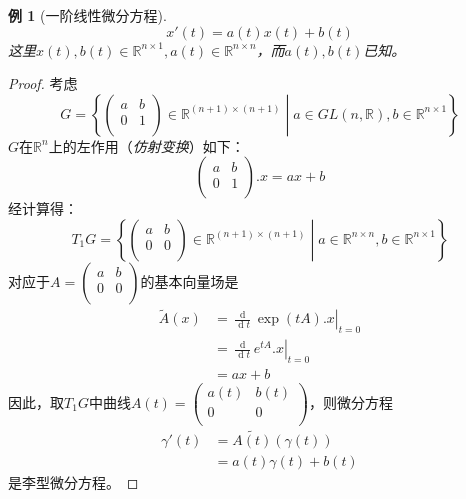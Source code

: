 \documentclass[winfonts,UTF8,c5size,a4paper,fancyhdr,hyperref,titlepage,nocap]{ctexart}
\newtheorem{exa}[thm]{例}
\theoremstyle{definition}
\theoremstyle{remark}
\numberwithin{equation}{subsection}
\newcommand{\Real}{\mathbb{R}}
\newcommand{\dt}{\frac{\operatorname{d}}{\operatorname{d}t}}
\newcommand{\local}[2]{\left.{#1}\right|_{#2}}%
\newcommand{\localt}[1]{\local{#1}{t=0}}%
\begin{document}
\begin{exa}[一阶线性微分方程]
\begin{equation*}
x'(t)=a(t)x(t)+b(t)
\end{equation*}
这里$x(t),b(t)\in\Real^{n\times1}, a(t)\in\Real^{n\times n}$，而$a(t),b(t)$已知。
\end{exa}
\begin{proof}
考虑
\begin{equation*}
G=\left\{\begin{pmatrix}
            a & b \\
            0 & 1 \\
          \end{pmatrix}\in\Real^{(n+1)\times(n+1)}
\middle| a\in GL(n,\Real), b\in\Real^{n\times1}\right\}
\end{equation*}
$G$在$\Real^n$上的左作用（\emph{仿射变换}）如下：
\begin{equation*}
\begin{pmatrix}
  a & b \\
  0 & 1 \\
\end{pmatrix}.x=ax+b
\end{equation*}
经计算得：
\begin{equation*}
T_1G=\left\{\begin{pmatrix}
            a & b \\
            0 & 0 \\
          \end{pmatrix}\in\Real^{(n+1)\times(n+1)}
\middle| a\in\Real^{n\times n}, b\in\Real^{n\times1}\right\}
\end{equation*}
对应于$A=\begin{pmatrix}
            a & b \\
            0 & 0 \\
          \end{pmatrix}$的基本向量场是
\begin{align*}
  \widetilde{A}(x)&=\localt{\dt\exp(tA).x}\\
                         &=\localt{\dt e^{tA}.x}\\
                         &=ax+b
\end{align*}
因此，取$T_1G$中曲线$A(t)=\begin{pmatrix}
            a(t) & b(t) \\
            0 & 0 \\
          \end{pmatrix}$，则微分方程
\begin{align*}
\gamma'(t)&=\widetilde{A(t)}(\gamma(t))\\
          &=a(t)\gamma(t)+b(t)
\end{align*}
是李型微分方程。
\end{proof}
\end{document}
